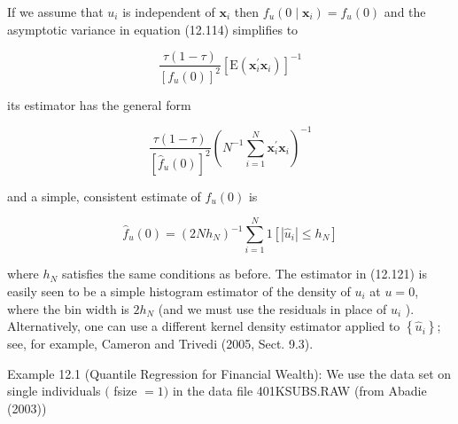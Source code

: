 \documentclass[10pt]{article}
\begin{document}
If we assume that $u_{i}$ is independent of $\mathbf{x}_{i}$ then $f_{u}\left(0 \mid \mathbf{x}_{i}\right)=f_{u}(0)$ and the asymptotic variance in equation (12.114) simplifies to


\begin{equation*}
\frac{\tau(1-\tau)}{\left[f_{u}(0)\right]^{2}}\left[\mathrm{E}\left(\mathbf{x}_{i}^{\prime} \mathbf{x}_{i}\right)\right]^{-1} \tag{12.119}
\end{equation*}


its estimator has the general form


\begin{equation*}
\frac{\tau(1-\tau)}{\left[\hat{f}_{u}(0)\right]^{2}}\left(N^{-1} \sum_{i=1}^{N} \mathbf{x}_{i}^{\prime} \mathbf{x}_{i}\right)^{-1} \tag{12.120}
\end{equation*}


and a simple, consistent estimate of $f_{u}(0)$ is


\begin{equation*}
\hat{f}_{u}(0)=\left(2 N h_{N}\right)^{-1} \sum_{i=1}^{N} 1\left[\left|\hat{u}_{i}\right| \leq h_{N}\right] \tag{12.121}
\end{equation*}


where $h_{N}$ satisfies the same conditions as before. The estimator in (12.121) is easily seen to be a simple histogram estimator of the density of $u_{i}$ at $u=0$, where the bin width is $2 h_{N}$ (and we must use the residuals in place of $u_{i}$ ). Alternatively, one can use a different kernel density estimator applied to $\left\{\hat{u}_{i}\right\}$; see, for example, Cameron and Trivedi (2005, Sect. 9.3).

Example 12.1 (Quantile Regression for Financial Wealth): We use the data set on single individuals $($ fsize $=1)$ in the data file 401KSUBS.RAW (from Abadie (2003))
\end{document}
